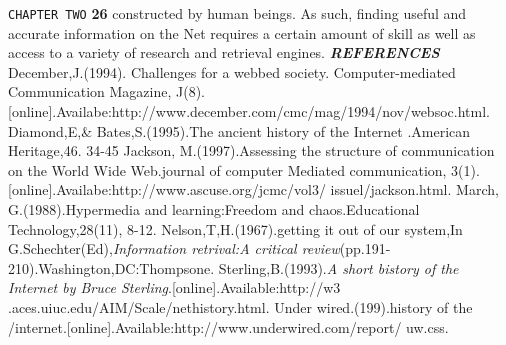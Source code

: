 \documentclass{book}
\begin{document}
\begin{flushleft}
\texttt{CHAPTER TWO}
\hspace*{0.5cm}
\textbf{26}
\vspace*{0.7cm}
constructed by human beings. As such, finding useful and accurate information on the
Net requires a certain amount of skill as well as access to a variety of research and
retrieval engines.
\emph{\textbf{REFERENCES}}
December,J.(1994). Challenges for a webbed society. Computer-mediated Communication Magazine,
J(8).[online].Availabe:http://www.december.com/cmc/mag/1994/nov/websoc.html.
Diamond,E,& Bates,S.(1995).The ancient history of the Internet .American Heritage,46. 34-45
Jackson, M.(1997).Assessing the structure of communication on the World Wide Web.journal of
computer Mediated communication, 3(1).[online].Availabe:http://www.ascuse.org/jcmc/vol3/
issuel/jackson.html.
March, G.(1988).Hypermedia and learning:Freedom and chaos.Educational Technology,28(11),
8-12.
Nelson,T,H.(1967).getting it out of our system,In G.Schechter(Ed),\emph{Information retrival:A
critical review}(pp.191-210).Washington,DC:Thompsone.
Sterling,B.(1993).\emph{A short bistory of the Internet by Bruce Sterling}.[online].Available:http://w3
.aces.uiuc.edu/AIM/Scale/nethistory.html.
Under wired.(199).history of the /internet.[online].Available:http://www.underwired.com/report/
uw.css. 
\end{flushleft}
\end{document}
